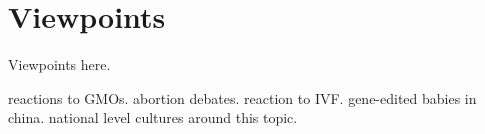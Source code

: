 \section{Viewpoints}
\label{sec:viewpoints}

Viewpoints here.

reactions to GMOs.
abortion debates.
reaction to IVF.
gene-edited babies in china.
national level cultures around this topic.
